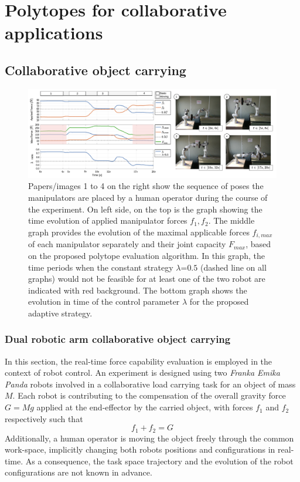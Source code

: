 
\chapter{Polytopes for collaborative applications}


\section{Collaborative object carrying}

\begin{figure}[!h]
    \centering
    \includegraphics[width=\linewidth]{Papers/images/dual-manip-6.pdf}
    \caption{Papers/images 1 to 4 on the right show the sequence of poses the manipulators are placed by a human operator during the course of the experiment. On left side, on the top is the graph showing the time evolution of applied manipulator forces $f_1,f_2$. The middle graph provides the evolution of the maximal applicable forces $f_{i,max}$ of each manipulator separately and their joint capacity $F_{max}$, based on the proposed polytope evaluation algorithm. In this graph,  the time periods when the constant strategy $\lambda$=$0.5$ (dashed line on all graphs) would not be feasible for at least one of the two robot are indicated with red background. The bottom graph shows the  evolution in time of the control parameter $\lambda$ for the proposed adaptive strategy.}
    \label{fig:dual_manip}
    \vspace*{-0.3cm}
\end{figure}


\subsection{Dual robotic arm collaborative object carrying}\label{ch:robot_robot_carrying}

In this section, the real-time force capability evaluation is employed in the context of robot control. An experiment is designed using two \textit{Franka Emika Panda} robots involved in a collaborative load carrying task for an object of mass $M$. Each robot is contributing to the compensation of the overall gravity force $G=Mg$ applied at the end-effector by the carried object, with forces $f_1$ and $f_2$ respectively such that
\begin{equation}
    f_1 + f_2 = G
\end{equation}
Additionally, a human operator is moving the object freely through the common work-space, implicitly changing both robots positions and configurations in real-time. As a consequence, the task space trajectory and the evolution of the robot configurations are not known in advance.

